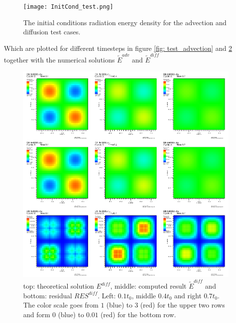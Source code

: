 \begin{figure}
\centering
\texttt{[image: InitCond\_test.png]}
\caption{The initial conditions radiation energy density for the advection and diffusion test cases.}
\label{fig: InitCond_test}
\end{figure}

Which are plotted for different timesteps in figure \ref{fig: test_advection} and \ref{fig: test_diffusion} together with the numerical solutions $\tilde{E}^{adv}$ and $\tilde{E}^{diff}$


\begin{figure}
\includegraphics[width = \textwidth]{visit0001.png}
\caption{top: theoretical solution $E^{diff}$, middle: computed result $\tilde{E}^{diff}$ and bottom: residual $RES^{diff}$. Left: $0.1 t_0$, middle $0.4 t_0$ and right $0.7 t_0$. The color scale goes from $1$ (blue) to $3$ (red) for the upper two rows and form $0$ (blue) to $0.01$ (red) for the bottom row.}
\label{fig: test_diffusion}
\end{figure}


